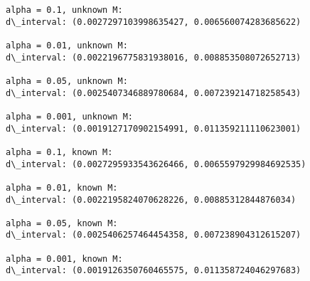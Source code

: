 \documentclass[11pt]{article}
\begin{document}
    \begin{Verbatim}[commandchars=\\\{\}]
alpha = 0.1, unknown M:
d\_interval: (0.0027297103998635427, 0.006560074283685622)

alpha = 0.01, unknown M:
d\_interval: (0.0022196775831938016, 0.008853508072652713)

alpha = 0.05, unknown M:
d\_interval: (0.0025407346889780684, 0.007239214718258543)

alpha = 0.001, unknown M:
d\_interval: (0.0019127170902154991, 0.011359211110623001)

alpha = 0.1, known M:
d\_interval: (0.0027295933543626466, 0.0065597929984692535)

alpha = 0.01, known M:
d\_interval: (0.0022195824070628226, 0.00885312844876034)

alpha = 0.05, known M:
d\_interval: (0.0025406257464454358, 0.007238904312615207)

alpha = 0.001, known M:
d\_interval: (0.0019126350760465575, 0.011358724046297683)


    \end{Verbatim}

    \begin{center}
    \end{center}
    { \hspace*{\fill} \\}
    
\end{document}
